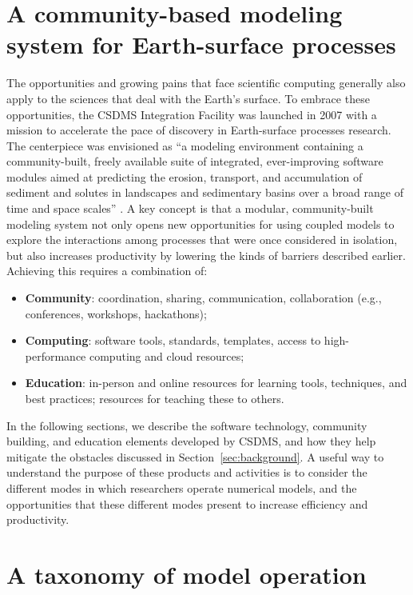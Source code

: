 \documentclass[journal abbreviation, manuscript]{copernicus}
\begin{document}
\section{A community-based modeling system for Earth-surface processes}
\label{sec:csdms}

The opportunities and growing pains that face scientific computing generally also apply to the sciences that deal with the Earth's surface. To embrace these opportunities, the CSDMS Integration Facility was launched in 2007 with a mission to accelerate the pace of discovery in Earth-surface processes research. The centerpiece was envisioned as ``a modeling environment containing a community-built, freely available suite of integrated, ever-improving software modules aimed at predicting the erosion, transport, and accumulation of sediment and solutes in landscapes and sedimentary basins over a broad range of time and space scales'' \citep{anderson2004community}. A key concept is that a modular, community-built modeling system not only opens new opportunities for using coupled models to explore the interactions among processes that were once considered in isolation, 
but also increases productivity by lowering the kinds of barriers described earlier. Achieving this requires a combination of:
\begin{itemize}
\item
\textbf{Community}: coordination, sharing, communication, collaboration (e.g., conferences, workshops, hackathons);
\item
\textbf{Computing}: software tools, standards, templates, access to high-performance computing and cloud resources;
\item
\textbf{Education}: in-person and online resources for learning tools, techniques, and best practices; resources for teaching these to others.
\end{itemize}
In the following sections, we describe the software technology, community building, and education elements developed by CSDMS, and how they help mitigate the obstacles discussed in Section~\ref{sec:background}. A useful way to understand the purpose of these products and activities is to consider the different modes in which researchers operate numerical models, and the opportunities that these different modes present to increase efficiency and productivity.


\section{A taxonomy of model operation}
\label{sec:taxonomy}
\end{document}
